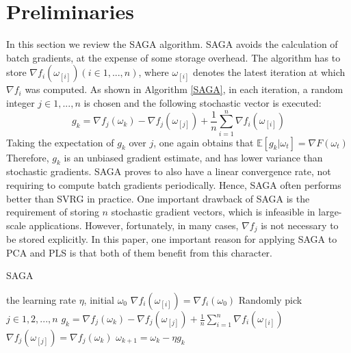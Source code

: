 \documentclass[runningheads,a4paper]{llncs}
\begin{document}
\section{Preliminaries}
\label{preliminaries}
In this section we review the SAGA algorithm.
SAGA avoids the calculation of batch gradients, at the expense of some storage overhead. The algorithm has to store $\nabla f_{i}(\omega_{[i]})(i \in {1, ... , n})$, where $\omega_{[i]}$ denotes the latest iteration at which $\nabla f_i$ was computed. As shown in Algorithm \ref{SAGA}, in each iteration, a random integer $j \in {1, ..., n}$ is chosen and the following stochastic vector is executed:
$$g_k = \nabla f_{j}(\omega_{k}) - \nabla f_{j}(\omega_{[j]}) + \frac{1}{n} \sum\limits_{i=1}^{n}\nabla f_{i}(\omega_{[i]})$$
Taking the expectation of $g_k$ over $j$, one again obtains that 
 $\mathbb{E}[g_k | \omega_t] = \nabla F(\omega_{t})$
 Therefore, $g_k$ is an unbiased gradient estimate, and has lower variance than stochastic gradients. 
 SAGA proves to also have a linear convergence rate, not requiring to compute batch gradients periodically. Hence, SAGA often performs better than SVRG in practice. One important drawback of SAGA is the requirement of storing $n$ stochastic gradient vectors, which is infeasible in large-scale applications. However, fortunately, in many cases, $\nabla f_{j}$ is not necessary to be stored explicitly. 
 In this paper, one important reason for applying SAGA to PCA and PLS is that both of them benefit from this character.
 


 \begin{algorithm}[t]
	\caption{\textsc{SAGA}}
	\label{SAGA}
	\begin{algorithmic}[1]
	\Require the learning rate $\eta$,  initial $\omega_0$
		\State $\nabla f_{i}(\omega_{[i]}) = \nabla f_{i}(\omega_{0})$
	\EndFor
		\State Randomly pick $j\in{1, 2, ..., n}$
		\State $g_k = \nabla f_{j}(\omega_{k}) - \nabla f_{j}(\omega_{[j]}) + \frac{1}{n} \sum\limits_{i=1}^{n}\nabla f_{i}(\omega_{[i]})$
		\State $\nabla f_{j}(\omega_{[j]}) = \nabla f_{j}(\omega_{k})$
		\State $\omega_{k+1} = \omega_{k} - \eta g_k$
		
	\EndFor 
	\end{algorithmic}

\end{algorithm}
\end{document}
